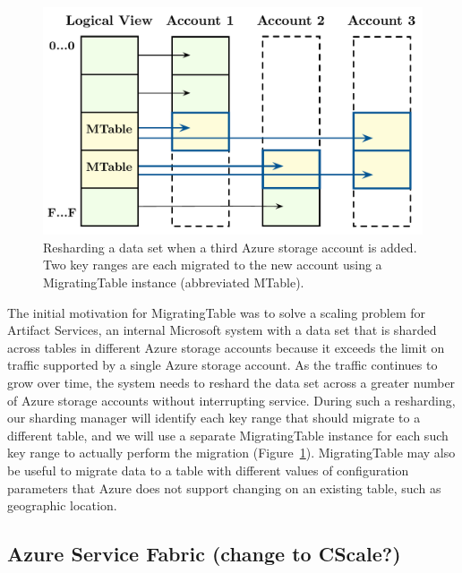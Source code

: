 \begin{figure}[t]
\centering
\includegraphics[width=\linewidth]{img/livemigration}
\caption{Resharding a data set when a third Azure storage account is added. Two key ranges are each migrated to the new account using a MigratingTable instance (abbreviated MTable).}
\label{fig:livemigration}
\end{figure}

The initial motivation for MigratingTable was to solve a scaling problem for Artifact Services, an internal Microsoft system with a data set that is sharded across tables in different Azure storage accounts because it exceeds the limit on traffic supported by a single Azure storage account.  As the traffic continues to grow over time, the system needs to reshard the data set across a greater number of Azure storage accounts without interrupting service.  During such a resharding, our sharding manager will identify each key range that should migrate to a different table, and we will use a separate MigratingTable instance for each such key range to actually perform the migration (Figure~\ref{fig:livemigration}).  MigratingTable may also be useful to migrate data to a table with different values of configuration parameters that Azure does not support changing on an existing table, such as geographic location.

\subsection{Azure Service Fabric (change to CScale?)}
\label{sec:cases:fabric}


